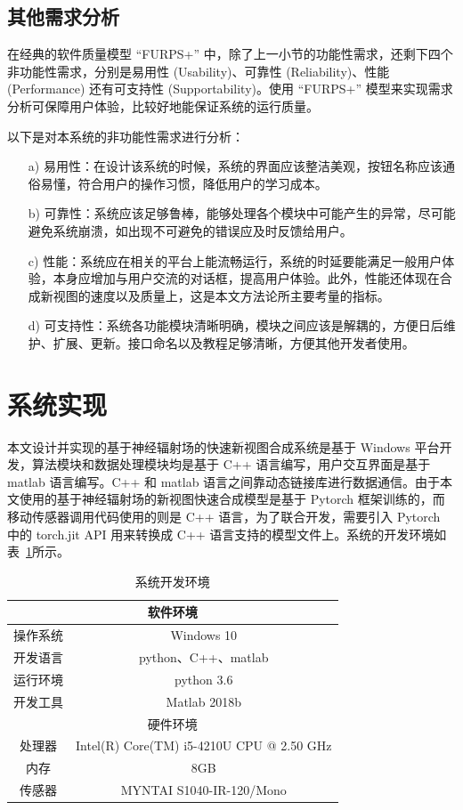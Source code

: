 \subsection{其他需求分析}
在经典的软件质量模型 “FURPS+” 中，除了上一小节的功能性需求，还剩下四个非功能性需求，分别是易用性 (Usability)、可靠性 (Reliability)、性能 (Performance) 还有可支持性 (Supportability)。使用 “FURPS+” 模型来实现需求分析可保障用户体验，比较好地能保证系统的运行质量。

以下是对本系统的非功能性需求进行分析：
\begin{enumerate}
    \item [a)] 易用性：在设计该系统的时候，系统的界面应该整洁美观，按钮名称应该通俗易懂，符合用户的操作习惯，降低用户的学习成本。
    \item [b)] 可靠性：系统应该足够鲁棒，能够处理各个模块中可能产生的异常，尽可能避免系统崩溃，如出现不可避免的错误应及时反馈给用户。     
    \item [c)] 性能：系统应在相关的平台上能流畅运行，系统的时延要能满足一般用户体验，本身应增加与用户交流的对话框，提高用户体验。此外，性能还体现在合成新视图的速度以及质量上，这是本文方法论所主要考量的指标。
    \item [d)] 可支持性：系统各功能模块清晰明确，模块之间应该是解耦的，方便日后维护、扩展、更新。接口命名以及教程足够清晰，方便其他开发者使用。
\end{enumerate}

\section{系统实现}
本文设计并实现的基于神经辐射场的快速新视图合成系统是基于 Windows 平台开发，算法模块和数据处理模块均是基于 C++ 语言编写，用户交互界面是基于 matlab 语言编写。C++ 和 matlab 语言之间靠动态链接库进行数据通信。由于本文使用的基于神经辐射场的新视图快速合成模型是基于 Pytorch 框架训练的，而移动传感器调用代码使用的则是 C++ 语言，为了联合开发，需要引入 Pytorch 中的 torch.jit API 用来转换成 C++ 语言支持的模型文件上。系统的开发环境如表~\ref{tab:env1}所示。

\begin{table}[thbp]
  \centering
  \small{}\setlength{}
  \caption{系统开发环境}
  \begin{tabular}{|c|c|}
    \hline
    \multicolumn{2}{|c|}{软件环境}                \\
    \hline
    操作系统   & Windows 10 \\
    \hline
    开发语言   & python、C++、matlab \\
    \hline
    运行环境  & python 3.6    \\
    \hline
    开发工具  & Matlab 2018b  \\
    \hline
    \multicolumn{2}{|c|}{硬件环境} \\
    \hline
    处理器    &      Intel(R) Core(TM) i5-4210U CPU @ 2.50 GHz  \\
    \hline
    内存      &       8GB         \\
    \hline
    传感器    &     MYNTAI S1040-IR-120/Mono          \\
    \hline
  \end{tabular}
  \label{tab:env1}
\end{table}

